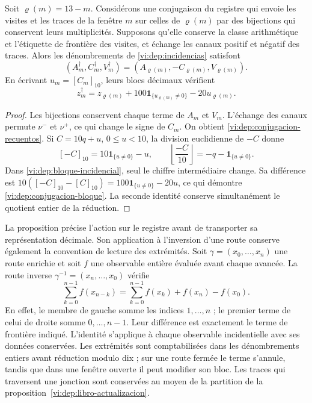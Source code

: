 \begin{proposition}
\label{vi:dep:conjugacion-incidencial}
Soit \(\varrho(m)=13-m\). Considérons une conjugaison du registre
qui envoie les visites et les traces de la fenêtre \(m\) sur celles de
\(\varrho(m)\) par des bijections qui conservent leurs multiplicités.
Supposons qu’elle conserve la classe arithmétique et l’étiquette de frontière
des visites, et échange les canaux positif et négatif des
traces. Alors les dénombrements de \eqref{vi:dep:incidencias} satisfont
\begin{equation}
 (A_m^\dagger,C_m^\dagger,V_m^\dagger)
 =(A_{\varrho(m)},-C_{\varrho(m)},V_{\varrho(m)}).
 \label{vi:dep:conjugacion-recuentos}
\end{equation}
En écrivant \(u_m=[C_m]_{10}\), leurs blocs décimaux vérifient
\begin{equation}
 z_m^\dagger=z_{\varrho(m)}
       +100\mathbf1_{\{u_{\varrho(m)}\ne0\}}-20u_{\varrho(m)}.
 \label{vi:dep:conjugacion-bloque}
\end{equation}
\end{proposition}
\begin{proof}
Les bijections conservent chaque terme de \(A_m\) et \(V_m\).
L’échange des canaux permute \(\nu^-\) et \(\nu^+\),
ce qui change le signe de \(C_m\). On obtient
\eqref{vi:dep:conjugacion-recuentos}. Si \(C=10q+u\),
\(0\le u<10\), la division euclidienne de \(-C\) donne
\[
 [-C]_{10}=10\mathbf1_{\{u\ne0\}}-u,
 \qquad
 \left\lfloor\frac{-C}{10}\right\rfloor
 =-q-\mathbf1_{\{u\ne0\}}.
\]
Dans \eqref{vi:dep:bloque-incidencial}, seul le chiffre
intermédiaire change. Sa différence est
\(10([-C]_{10}-[C]_{10})=100\mathbf1_{\{u\ne0\}}-20u\),
ce qui démontre \eqref{vi:dep:conjugacion-bloque}. La seconde
identité conserve simultanément le quotient entier de la réduction.
\end{proof}

La proposition précise l’action sur le registre avant de transporter
sa représentation décimale. Son application à l’inversion d’une route
conserve également la convention de lecture des extrémités. Soit
\(\gamma=(x_0,\ldots,x_n)\) une route enrichie et soit \(f\) une
observable entière évaluée avant chaque avancée. La route inverse
\(\gamma^{-1}=(x_n,\ldots,x_0)\) vérifie
\begin{equation}
 \sum_{k=0}^{n-1}f(x_{n-k})
 =\sum_{k=0}^{n-1}f(x_k)+f(x_n)-f(x_0).
 \label{vi:dep:conjugacion-frontera}
\end{equation}
En effet, le membre de gauche somme les indices \(1,\ldots,n\) ;
le premier terme de celui de droite somme \(0,\ldots,n-1\). Leur différence
est exactement le terme de frontière indiqué. L’identité s’applique
à chaque observable incidentielle avec ses données conservées. Les extrémités
sont comptabilisées dans les dénombrements entiers avant réduction modulo dix ;
sur une route fermée le terme s’annule, tandis que dans une fenêtre
ouverte il peut modifier son bloc. Les traces qui traversent une jonction
sont conservées au moyen de la partition de la
proposition~\ref{vi:dep:libro-actualizacion}.


